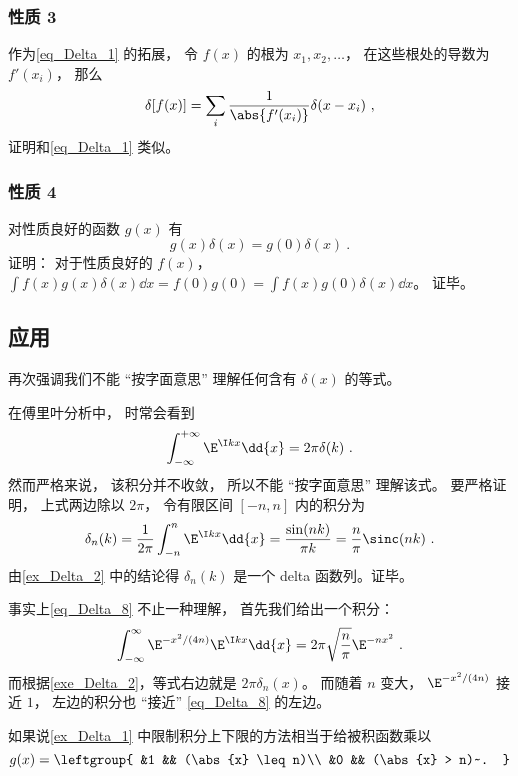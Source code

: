\subsubsection{性质 3}
作为\autoref{eq_Delta_1} 的拓展， 令 $f(x)$ 的根为 $x_1, x_2, \dots$， 在这些根处的导数为 $f'(x_i)$， 那么
\begin{equation}\label{eq_Delta_12}
\delta[f(x)] = \sum_i \frac{1}{\abs{f'(x_i)}} \delta(x - x_i)~,
\end{equation}
证明和\autoref{eq_Delta_1} 类似。

\subsubsection{性质 4}
对性质良好的函数 $g(x)$ 有
\begin{equation}
g(x)\delta(x) = g(0)\delta(x)~.
\end{equation}
证明： 对于性质良好的 $f(x)$， $\int f(x) g(x)\delta(x) \dd{x} = f(0)g(0) = \int f(x)g(0)\delta(x) \dd{x}$。 证毕。

\subsection{应用}
再次强调我们不能 “按字面意思” 理解任何含有 $\delta(x)$ 的等式。
\begin{example}{}\label{ex_Delta_1}
在傅里叶分析中， 时常会看到
\begin{equation}\label{eq_Delta_8}
\int_{-\infty}^{+\infty} \E^{\I kx}\dd{x} = 2\pi \delta(k)~.
\end{equation}
然而严格来说， 该积分并不收敛， 所以不能 “按字面意思” 理解该式。 要严格证明， 上式两边除以 $2\pi$， 令有限区间 $[-n,n]$ 内的积分为
\begin{equation}
\delta_n(k) = \frac{1}{2\pi}\int_{-n}^{n} \E^{\I kx}\dd{x} = \frac{\sin(n k)}{\pi k} = \frac{n}{\pi} \sinc(n k)~.
\end{equation}
由\autoref{ex_Delta_2} 中的结论得 $\delta_n(k)$ 是一个 delta 函数列。证毕。
\end{example}
\begin{example}{}
事实上\autoref{eq_Delta_8} 不止一种理解， 首先我们给出一个积分：
\begin{equation}
\int_{-\infty}^\infty \E^{-x^2/(4n)} \E^{\I k x} \dd{x} = 2\pi \sqrt{\frac{n}{\pi}}\E^{-n x^2}~.
\end{equation}
而根据\autoref{exe_Delta_2}，等式右边就是 $2\pi\delta_n(x)$。 而随着 $n$ 变大， $\E^{-x^2/(4n)}$ 接近 $1$， 左边的积分也 “接近” \autoref{eq_Delta_8} 的左边。

如果说\autoref{ex_Delta_1} 中限制积分上下限的方法相当于给被积函数乘以
\begin{equation}
g(x) = \leftgroup{
&1 && (\abs{x} \leq n)\\
&0 && (\abs{x} > n)~.
}\end{equation}

\end{example}

